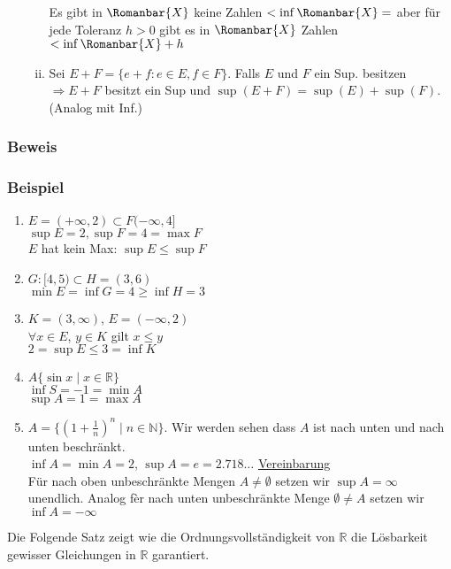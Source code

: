 \begin{enumerate}
\begin{enumerate}[(i)]
\begin{center}
\end{center}



Es gibt in $\Romanbar{X}$ keine Zahlen $<\inf\Romanbar{X}=$ aber für jede Toleranz $h>0$ gibt es in $\Romanbar{X}$ Zahlen $<\inf \Romanbar{X}+h$
\item Sei $E+F=\{ e+f:e\in E,f\in F\}$. Falls $E$ und $F$ ein Sup. besitzen $\Rightarrow E+F$ besitzt ein Sup und $\sup (E+F)=\sup(E)+\sup(F)$. (Analog mit Inf.) 
\end{enumerate}
\end{enumerate}
\subsubsection*{Beweis}
\subsubsection*{Beispiel}
\begin{enumerate}
\item $E=(+\infty,2)\subset F(-\infty,4\rbrack$\\
$\sup E=2, \sup F=4=\max F$\\
$E$ hat kein Max: $\sup E\leq \sup F$
\item $G:\lbrack 4,5)\subset H=(3,6)$\\
$\min E=\inf G=4\geq \inf H=3$
\item $K=(3,\infty)$, $E=(-\infty,2)$\\
$\forall x\in E$, $y\in K$ gilt $x\leq y$\\
$2=\sup E\leq 3=\inf K$
\item $A\{\sin x\mid x\in\mathbb{R}\}$\\
$\inf S=-1=\min A$\\
$\sup A=1=\max A$
\item $A=\{\left( 1+\frac{1}{n}\right)^n\mid n\in\mathbb{N} \}$. Wir werden sehen dass $A$ ist nach unten und nach unten beschränkt. \\
$\inf A=\min A=2$, $\sup A=e=2.718\dots$
\underline{Vereinbarung}\\
Für nach oben unbeschränkte Mengen $A\not=\emptyset$ setzen wir $\sup A=\infty$ unendlich. Analog fèr nach unten unbeschränkte Menge $\emptyset\not= A$ setzen wir $\inf A=-\infty$ 
\end{enumerate}
Die Folgende Satz zeigt wie die Ordnungsvollständigkeit von $\mathbb{R}$ die Lösbarkeit gewisser Gleichungen in $\mathbb{R}$ garantiert.

